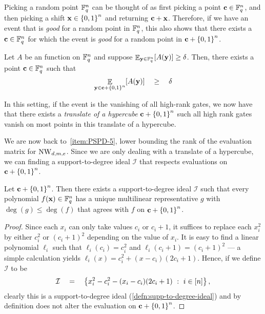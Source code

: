 Picking a random point $\mathbb{F}_q^n$ can be thought of as first picking a point $\mathbf{c} \in \mathbb{F}_q^n$, and then picking a shift $\mathbf{x} \in \left\{0,1\right\}^n$ and returning $\mathbf{c} + \mathbf{x}$.
Therefore, if we have an event that is \emph{good} for a random point in $\mathbb{F}_q^n$, this also shows that there exists a $\mathbf{c} \in \mathbb{F}_q^n$ for which the event is \emph{good} for a random point in $\mathbf{c} + \left\{0,1\right\}^n$.

\begin{lemma}\label{lem:shift-of-hypercube-averaging}
Let $A$ be an function on $\mathbb{F}_q^n$ and suppose $\mathop{\mathbb{E}}_{\mathbf{y} \in \mathbb{F}_q^n}[A(\mathbf{y})] \geq \delta$. Then, there exists a point $\mathbf{c} \in \mathbb{F}_q^n$ such that 
\[
\mathop{\mathbb{E}}\limits_{\mathbf{y} \in \mathbf{c} + \left\{0,1\right\}^n}[A(\mathbf{y})] \quad \geq \quad \delta
\]
\end{lemma}

In this setting, if the event is the vanishing of all high-rank gates, we now have that there exists a \emph{translate of a hypercube} $\mathbf{c} + \left\{0,1\right\}^n$ such all high rank gates vanish on most points in this translate of a hypercube.

We are now back to~\autoref{item:PSPD-5}, lower bounding the rank of the evaluation matrix for $\operatorname{\mathrm{NW}}_{d,m,e}$.
Since we are only dealing with a translate of a hypercube, we can finding a support-to-degree ideal $\mathcal{I}$ that respects evaluations on $\mathbf{c} + \left\{0,1\right\}^n$.

\begin{lemma}\label{lem:multilinearization-translate}
  Let $\mathbf{c} + \left\{0,1\right\}^n$.
Then there exists a support-to-degree ideal $\mathcal{I}$ such that every polynomial $f(\mathbf{x}) \in \mathbb{F}_q^n$ has a unique multilinear representative $g$ with $\deg(g) \leq \deg(f)$ that agrees with $f$ on $\mathbf{c} + \left\{0,1\right\}^n$.
\end{lemma}
\begin{proof}
  Since each $x_i$ can only take values $c_i$ or $c_i + 1$, it suffices to replace each $x_i^2$ by either $c_i^2$ or $(c_i + 1)^2$ depending on the value of $x_i$.
It is easy to find a linear polynomial $\ell_i$ such that $\ell_i(c_i) = c_i^2$ and $\ell_i(c_i+1) = (c_i+1)^2$ --- a simple calculation yields $\ell_i(x) = c_i^2 + (x - c_i)(2c_i + 1)$.
Hence, if we define $\mathcal{I}$ to be
\[
\mathcal{I} \quad = \quad \left\{{x_i^2 - c_i^2 - (x_i - c_i)(2c_i + 1)}\ : \ {i\in [n]}\right\},
\]
clearly this is a support-to-degree ideal (\autoref{defn:supp-to-degree-ideal}) and by definition does not alter the evaluation on $\mathbf{c} + \left\{0,1\right\}^n$. 
\end{proof}

